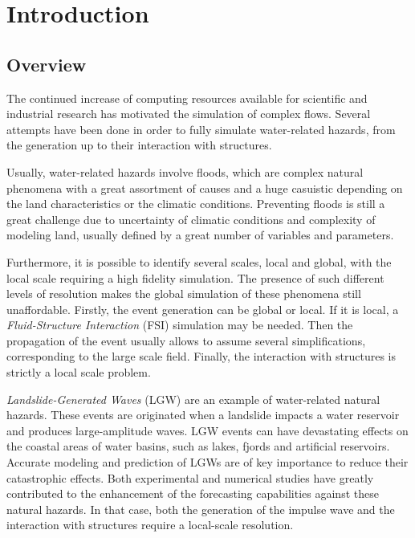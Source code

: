 
\chapter{Introduction}
\label{chapter_introduction}




\section{Overview}


The continued increase of computing resources available for scientific and industrial research has motivated the simulation of complex flows. Several attempts have been done in order to fully simulate water-related hazards, from the generation up to their interaction with structures.

Usually, water-related hazards involve floods, which are complex natural phenomena with a great assortment of causes and a huge casuistic depending on the land characteristics or the climatic conditions. Preventing floods is still a great challenge due to uncertainty of climatic conditions and complexity of modeling land, usually defined by a great number of variables and parameters.

Furthermore, it is possible to identify several scales, local and global, with the local scale requiring a high fidelity simulation. The presence of such different levels of resolution makes the global simulation of these phenomena still unaffordable. Firstly, the event generation can be global or local. If it is local, a \emph{Fluid-Structure Interaction} (FSI) simulation may be needed. Then the propagation of the event usually allows to assume several simplifications, corresponding to the large scale field. Finally, the interaction with structures is strictly a local scale problem.

\emph{Landslide-Generated Waves} (LGW) are an example of water-related natural hazards. These events are originated when a landslide impacts a water reservoir and produces large-amplitude waves. LGW events can have devastating effects on the coastal areas of water basins, such as lakes, fjords and artificial reservoirs. Accurate modeling and prediction of LGWs are of key importance to reduce their catastrophic effects. Both experimental and numerical studies have greatly contributed to the enhancement of the forecasting capabilities against these natural hazards. In that case, both the generation of the impulse wave and the interaction with structures require a local-scale resolution.

